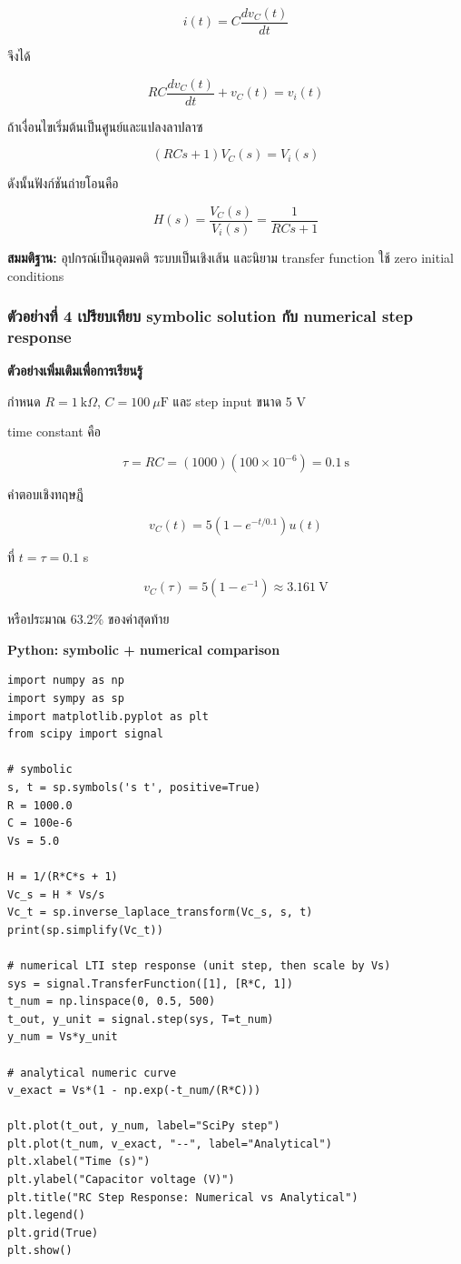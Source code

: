 \[
i(t)=C\frac{dv_C(t)}{dt}
\]

จึงได้

\[
RC\frac{dv_C(t)}{dt}+v_C(t)=v_i(t)
\]

ถ้าเงื่อนไขเริ่มต้นเป็นศูนย์และแปลงลาปลาซ

\[
(RCs+1)V_C(s)=V_i(s)
\]

ดังนั้นฟังก์ชันถ่ายโอนคือ

\[
H(s)=\frac{V_C(s)}{V_i(s)}=\frac{1}{RCs+1}
\]

\textbf{สมมติฐาน:} อุปกรณ์เป็นอุดมคติ ระบบเป็นเชิงเส้น และนิยาม transfer function ใช้ zero initial conditions

\subsubsection{ตัวอย่างที่ 4 เปรียบเทียบ symbolic solution กับ numerical step response}

\textbf{ตัวอย่างเพิ่มเติมเพื่อการเรียนรู้}

กำหนด $R=1\ \text{k}\Omega$, $C=100\ \mu\text{F}$ และ step input ขนาด 5 V

time constant คือ

\[
\tau=RC=(1000)(100\times10^{-6})=0.1\ \text{s}
\]

คำตอบเชิงทฤษฎี

\[
v_C(t)=5\left(1-e^{-t/0.1}\right)u(t)
\]

ที่ $t=\tau=0.1$ s

\[
v_C(\tau)=5(1-e^{-1})\approx3.161\ \text{V}
\]

หรือประมาณ 63.2\% ของค่าสุดท้าย

\textbf{Python: symbolic + numerical comparison}

\begin{verbatim}
import numpy as np
import sympy as sp
import matplotlib.pyplot as plt
from scipy import signal

# symbolic
s, t = sp.symbols('s t', positive=True)
R = 1000.0
C = 100e-6
Vs = 5.0

H = 1/(R*C*s + 1)
Vc_s = H * Vs/s
Vc_t = sp.inverse_laplace_transform(Vc_s, s, t)
print(sp.simplify(Vc_t))

# numerical LTI step response (unit step, then scale by Vs)
sys = signal.TransferFunction([1], [R*C, 1])
t_num = np.linspace(0, 0.5, 500)
t_out, y_unit = signal.step(sys, T=t_num)
y_num = Vs*y_unit

# analytical numeric curve
v_exact = Vs*(1 - np.exp(-t_num/(R*C)))

plt.plot(t_out, y_num, label="SciPy step")
plt.plot(t_num, v_exact, "--", label="Analytical")
plt.xlabel("Time (s)")
plt.ylabel("Capacitor voltage (V)")
plt.title("RC Step Response: Numerical vs Analytical")
plt.legend()
plt.grid(True)
plt.show()
\end{verbatim}

